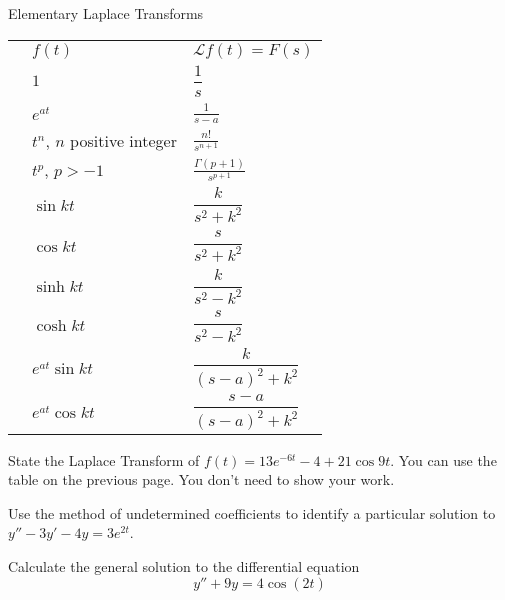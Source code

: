 \documentclass[12pt]{exam}
\begin{document}
    


\newpage

\begin{center}
\begin{large}
Elementary Laplace Transforms
\end{large}
\end{center}

\newcommand{\LTNUM}{\stepcounter{NumberInTable}{(\theNumberInTable)}}

\vspace{-2ex}
    \renewcommand{\arraystretch}{2.5}
    \begin{center}
    \begin{tabular}{ p{1cm} p{5cm} p{4.8cm} }
        & $f(t)$ & $\mathcal L{f(t)}=F(s)$ \\ 
        \LTNUM & $1$ & $\displaystyle \dfrac{1}{s}$  \\ 
        \LTNUM & $e^{at}$	& $\displaystyle \frac{1}{s-a}$ \\ 
        \LTNUM & $t^n$, $n$ positive integer	& $\displaystyle \frac{n!}{s^{n+1}}$  \\ 
        \LTNUM & $t^p$, $p > -1$	& $\displaystyle \frac{\Gamma(p+1)}{s^{p+1}}$  \\ 
        \LTNUM &$\sin kt$ 	& $\displaystyle \dfrac{k}{s^2+k^2}$ \\ 
        \LTNUM &$\cos kt$ 	& $\displaystyle \dfrac{s}{s^2+k^2}$ \\ 
        \LTNUM &$\sinh kt$	& $\displaystyle \dfrac{k}{s^2-k^2}$ \\ 
        \LTNUM &$\cosh kt$	& $\displaystyle \dfrac{s}{s^2-k^2}$ \\ 
        \LTNUM &$e^{at}\sin kt$	& $\displaystyle \dfrac{k}{(s-a)^2+k^2}$   \\ 
        \LTNUM &$e^{at}\cos kt$	& $\displaystyle \dfrac{s-a}{(s-a)^2+k^2}$  \\ 
    \end{tabular}
\end{center}

\newpage 

\begin{questions}


    \question[4]  State the Laplace Transform of $f(t) = 13e^{-6t}-4 + 21\cos 9t$. You can use the table on the previous page. You don't need to show your work. 

    \vspace{6cm}

    \question[8] Use the method of undetermined coefficients to identify a particular solution to $y''-3y'-4y=3e^{2t}$.
    
    

    \newpage
    
    \question[8] Calculate the general solution to the differential equation $$y'' + 9y = 4\cos(2t)$$ 


\end{questions}
\end{document}
